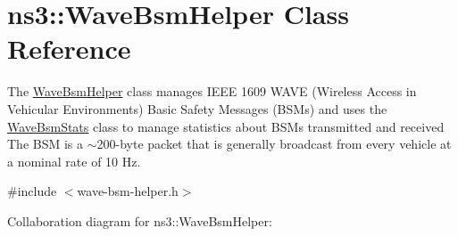 \hypertarget{classns3_1_1WaveBsmHelper}{}\section{ns3\+:\+:Wave\+Bsm\+Helper Class Reference}
\label{classns3_1_1WaveBsmHelper}


The \hyperlink{classns3_1_1WaveBsmHelper}{Wave\+Bsm\+Helper} class manages I\+E\+EE 1609 W\+A\+VE (Wireless Access in Vehicular Environments) Basic Safety Messages (B\+S\+Ms) and uses the \hyperlink{classns3_1_1WaveBsmStats}{Wave\+Bsm\+Stats} class to manage statistics about B\+S\+Ms transmitted and received The B\+SM is a $\sim$200-\/byte packet that is generally broadcast from every vehicle at a nominal rate of 10 Hz.  




{\ttfamily \#include $<$wave-\/bsm-\/helper.\+h$>$}



Collaboration diagram for ns3\+:\+:Wave\+Bsm\+Helper\+:
